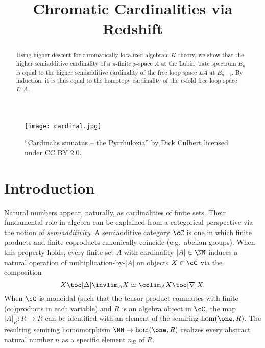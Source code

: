 \documentclass[english]{article}
\title{Chromatic Cardinalities via Redshift}
\begin{document}
\maketitle

\begin{abstract}
    Using higher descent for chromatically localized algebraic $K$-theory, we show that the higher semiadditive cardinality of a $\pi$-finite $p$-space $A$ at the Lubin--Tate spectrum $E_n$ is equal to the higher semiadditive cardinality of the free loop space $LA$ at $E_{n-1}$.
    By induction, it is thus equal to the homotopy cardinality of the $n$-fold free loop space $L^n A$.
\end{abstract}

\begin{figure}[ht!]
    \centering
    \texttt{[image: cardinal.jpg]}
    \caption*{
        ``\href{https://www.flickr.com/photos/92252798@N07/26805851281/}{Cardinalis sinuatus -- the Pyrrhuloxia}''
        by \href{https://www.flickr.com/photos/92252798@N07/}{Dick Culbert}
        licensed under \href{https://creativecommons.org/licenses/by/2.0/}{CC BY 2.0}.
    }
\end{figure}

\newpage

\section{Introduction}

Natural numbers appear, naturally, as cardinalities of finite sets. Their fundamental role in algebra can be explained from a categorical perspective via the notion of \textit{semiadditivity}. 
A semiadditive category $\cC$ is one in which finite products and finite coproducts canonically coincide (e.g.\ abelian groups). 
When this property holds, every finite set $A$ with cardinality $|A| \in \NN$ induces a natural operation of multiplication-by-$|A|$ on objects $X \in \cC$ via the composition
\[
    X \too[\Delta] \invlim_A X \simeq \colim_A X \too[\nabla] X.
\]
When $\cC$ is monoidal (such that the tensor product commutes with finite (co)products in each variable) and $R$ is an algebra object in $\cC$, the map $|A|_R\colon R \to R$ can be identified with an element of the semiring $\hom(\one,R)$. The resulting semiring homomorphism $\NN \to \hom(\one,R)$ realizes every abstract natural number $n$ as a specific element $n_R$ of $R$. 
\end{document}
